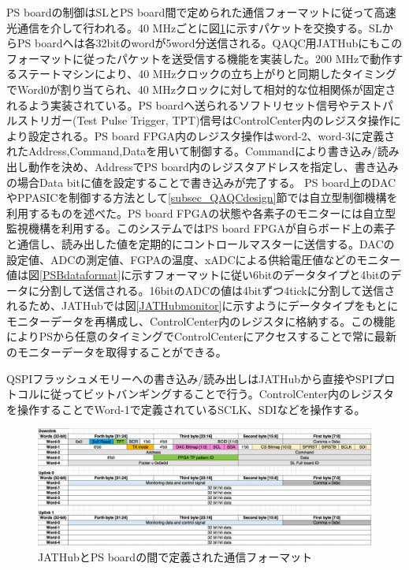 PS boardの制御はSLとPS board間で定められた通信フォーマットに従って高速光通信を介して行われる。40 MHzごとに図\ref{JATHubpsbformat}に示すパケットを交換する。SLからPS boardへは各32bitのwordが5word分送信される。QAQC用JATHubにもこのフォーマットに従ったパケットを送受信する機能を実装した。200 MHzで動作するステートマシンにより、40 MHzクロックの立ち上がりと同期したタイミングでWord0が割り当てられ、40 MHzクロックに対して相対的な位相関係が固定されるよう実装されている。PS boardへ送られるソフトリセット信号やテストパルストリガー(Test Pulse Trigger, TPT)信号はControlCenter内のレジスタ操作により設定される。PS board FPGA内のレジスタ操作はword-2、word-3に定義されたAddress,Command,Dataを用いて制御する。Commandにより書き込み/読み出し動作を決め、AddressでPS board内のレジスタアドレスを指定し、書き込みの場合Data bitに値を設定することで書き込みが完了する。
PS board上のDACやPPASICを制御する方法として\ref{subsec_QAQCdesign}節では自立型制御機構を利用するものを述べた。PS board FPGAの状態や各素子のモニターには自立型監視機構を利用する。このシステムではPS board FPGAが自らボード上の素子と通信し、読み出した値を定期的にコントロールマスターに送信する。DACの設定値、ADCの測定値、FGPAの温度、xADCによる供給電圧値などのモニター値は図\ref{PSBdataformat}に示すフォーマットに従い6bitのデータタイプと4bitのデータに分割して送信される。16bitのADCの値は4bitずつ4tickに分割して送信されるため、JATHubでは図\ref{JATHubmonitor}に示すようにデータタイプをもとにモニターデータを再構成し、ControlCenter内のレジスタに格納する。この機能によりPSから任意のタイミングでControlCenterにアクセスすることで常に最新のモニターデータを取得することができる。

QSPIフラッシュメモリーへの書き込み/読み出しはJATHubから直接やSPIプロトコルに従ってビットバンギングすることで行う。ControlCenter内のレジスタを操作することでWord-1で定義されているSCLK、SDIなどを操作する。
\baselineskip

\begin{figure} 
\centering
\includegraphics[width=16cm]{fig/QAQC/JATHubpsbformat.png}
\caption[JATHubとPS boardの間で定義された通信フォーマット]{JATHubとPS boardの間で定義された通信フォーマット}
\label{JATHubpsbformat}
\end{figure}

